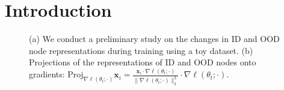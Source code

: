 \section{Introduction}
\label{Sec-Introduction}


\begin{figure}[!t]
	\centering
    \caption{(a) We conduct a preliminary study on the changes in ID and OOD node representations during training using a toy dataset.
(b) Projections of the representations of ID and OOD nodes onto gradients: $\text{Proj}_{\nabla \ell(\theta_t; \cdot)}\mathbf{x}_i = \frac{\mathbf{x}_i \cdot \nabla \ell(\theta_t; \cdot) }{\parallel \nabla \ell(\theta_t; \cdot) \parallel_2^2}\cdot \nabla \ell(\theta_t; \cdot)$.}
    \label{F-Trajectory}
    \vskip -0.1in
\end{figure}




 




